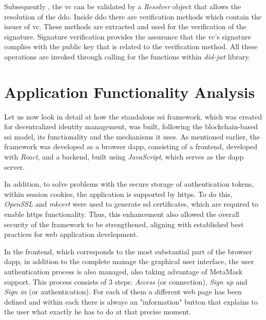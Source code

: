 Subsequently , the \gls{vc} can be validated by a \textit{Resolver} object that allows the resolution of the \gls{ddo}. Inside \gls{ddo} there are verification methods which contain 
the issuer of \gls{vc}.  These methods are extracted and used for the verification of the signature.  Signature verification provides the assurance that the \gls{vc}'s signature 
complies with the public key that is related to the verification method. All these operations are invoked through calling for the functions within \textit{did-jwt} library.



\section{Application Functionality Analysis}

Let us now look in detail at how the standalone \gls{ssi} framework, which was created for decentralized identity management, was built, following the blockchain-based \gls{ssi} model, 
its functionality and the mechanisms it uses. As mentioned earlier, the framework was developed as a browser \gls{dapp}, consisting of a frontend, developed with 
\textit{React}, and a backend, built using \textit{JavaScript}, which serves as the \gls{dapp} server. 

In addition, to solve problems with the secure storage of authentication tokens, within session cookies, the application is supported by \gls{https}. To do this, \textit{OpenSSL} and 
\textit{mkcert} were used to generate \gls{ssl} certificates, which are required to enable \gls{https} functionality. Thus, this enhancement also allowed the overall security 
of the framework to be strengthened, aligning with established best practices for web application development.



In the frontend, which corresponds to the most substantial part of the browser \gls{dapp}, in addition to the complete manage the graphical user interface, 
the user authentication process is also managed, also taking advantage of MetaMask support. This process consists of 3 steps: \textit{Access} (or connection), \textit{Sign up} and \textit{Sign in} (or
authentication). For each of them a different web page has been defined and within each there is always an "information" button that explains to the user what exactly he
has to do at that precise moment. 

